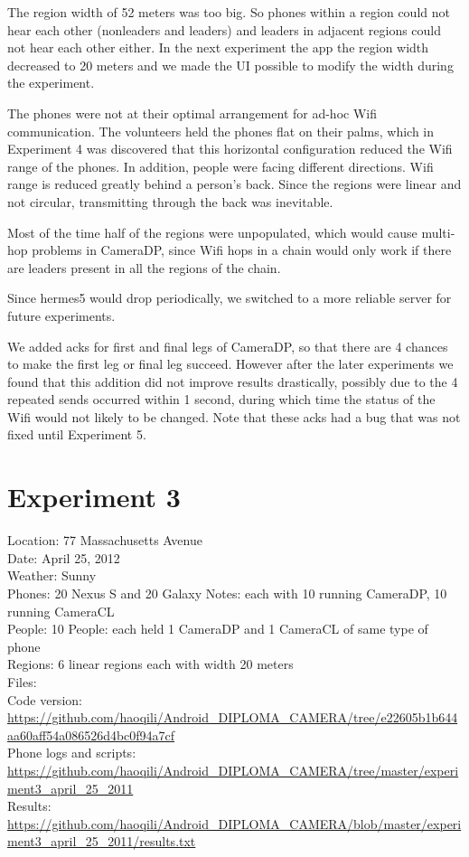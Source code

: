 The region width of 52 meters was too big. So phones within a region could not hear each other (nonleaders and leaders) and leaders in adjacent regions could not hear each other either. In the next experiment the app the region width decreased to 20 meters and we made the UI possible to modify the width during the experiment.

The phones were not at their optimal arrangement for ad-hoc Wifi communication. The volunteers held the phones flat on their palms, which in Experiment 4 was discovered that this horizontal configuration reduced the Wifi range of the phones. In addition, people were facing different directions. Wifi range is reduced greatly behind a person's back. Since the regions were linear and not circular, transmitting through the back was inevitable.

Most of the time half of the regions were unpopulated, which would cause multi-hop problems in CameraDP, since Wifi hops in a chain would only work if there are leaders present in all the regions of the chain.

Since hermes5 would drop periodically, we switched to a more reliable server for future experiments.

We added acks for first and final legs of CameraDP, so that there are 4 chances to make the first leg or final leg succeed. However after the later experiments we found that this addition did not improve results drastically, possibly due to the 4 repeated sends occurred within 1 second, during which time the status of the Wifi would not likely to be changed. Note that these acks had a bug that was not fixed until Experiment 5.

\section{Experiment 3}

Location: 77 Massachusetts Avenue\\
Date: April 25, 2012\\
Weather: Sunny\\
Phones: 20 Nexus S and 20 Galaxy Notes: each with 10 running CameraDP, 10 running CameraCL\\
People: 10 People: each held 1 CameraDP and 1 CameraCL of same type of phone\\
Regions: 6 linear regions each with width 20 meters\\
Files:\\
Code version: {\url{https://github.com/haoqili/Android_DIPLOMA_CAMERA/tree/e22605b1b644aa60aff54a086526d4bc0f94a7cf}}\\
Phone logs and scripts: {\url{https://github.com/haoqili/Android_DIPLOMA_CAMERA/tree/master/experiment3_april_25_2011}}\\ 
Results: {\url{https://github.com/haoqili/Android_DIPLOMA_CAMERA/blob/master/experiment3_april_25_2011/results.txt}}\\

